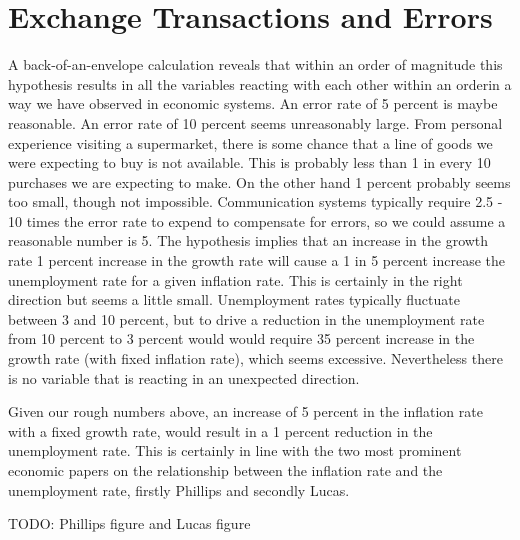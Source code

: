 \chapter{Exchange Transactions and Errors}
\label{chapter:exchange_transactions_and_errors}

A back-of-an-envelope calculation reveals that within an order of magnitude this hypothesis results
in all the variables reacting with each other within an orderin a way we have observed in economic
systems. An error rate of 5 percent is maybe reasonable. An error rate of 10 percent seems
unreasonably large. From personal experience visiting a supermarket, there is some chance that a
line of goods we were expecting to buy is not available. This is probably less than 1 in every 10
purchases we are expecting to make. On the other hand 1 percent probably seems too small, though not
impossible. Communication systems typically require 2.5 - 10 times the error rate to expend to
compensate for errors, so we could assume a reasonable number is 5. The hypothesis implies that an
increase in the growth rate  1 percent increase in the growth rate will cause a 1 in 5 percent
increase the unemployment rate for a given inflation rate. This is certainly in the right direction
but seems a little small. Unemployment rates typically fluctuate between 3 and 10 percent, but to
drive a reduction in the unemployment rate from 10 percent to 3 percent would would require 35
percent increase in the growth rate (with fixed inflation rate), which seems excessive. Nevertheless
there is no variable that is reacting in an unexpected direction.

Given our rough numbers above, an increase of 5 percent in the inflation rate with a fixed growth
rate, would result in a 1 percent reduction in the unemployment rate. This is certainly in line with
the two most prominent economic papers on the relationship between the inflation rate and the
unemployment rate, firstly Phillips and secondly Lucas.

TODO: Phillips figure and Lucas figure 
